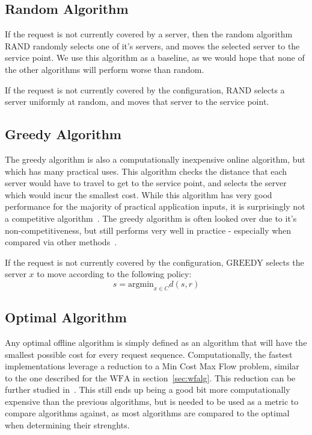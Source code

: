
\subsection{Random Algorithm}
\label{sec:rand}
If the request is not currently covered by a server, then the random algorithm $\mathrm{RAND}$ randomly selects one of it's servers, and moves the selected server to the service point. We use this algorithm as a baseline, as we would hope that none of the other algorithms will perform worse than random.

\begin{definition}
    If the request is not currently covered by the configuration, $\mathrm{RAND}$ selects a server uniformly at random, and moves that server to the service point.
\end{definition}

\subsection{Greedy Algorithm}
\label{sec:greedy}
The greedy algorithm is also a computationally inexpensive online algorithm, but which has many practical uses. This algorithm checks the distance that each server would have to travel to get to the service point, and selects the server which would incur the smallest cost. While this algorithm has very good performance for the majority of practical application inputs, it is surprisingly not a competitive algorithm~\cite{OnlineComp1998}. The greedy algorithm is often looked over due to it's non-competitiveness, but still performs very well in practice - especially when compared via other methods~\cite{bij2016, MAXMAX2005}.

\begin{definition}
    If the request is not currently covered by the configuration, $\mathrm{GREEDY}$ selects the server $x$ to move according to the following policy:
    \begin{equation*}
        s = \mathrm{argmin}_{x \in C} d(s, r)
    \end{equation*}
\end{definition}

\subsection{Optimal Algorithm}
\label{sec:OPT}
Any optimal offline algorithm is simply defined as an algorithm that will have the smallest possible cost for every request sequence. Computationally, the fastest implementations leverage a reduction to a Min Cost Max Flow problem, similar to the one described for the $\mathrm{WFA}$ in section~\ref{sec:wfalg}. This reduction can be further studied in~\cite{WFA2009}. This still ends up being a good bit more computationally expensive than the previous algorithms, but is needed to be used as a metric to compare algorithms against, as most algorithms are compared to the optimal when determining their strenghts.

